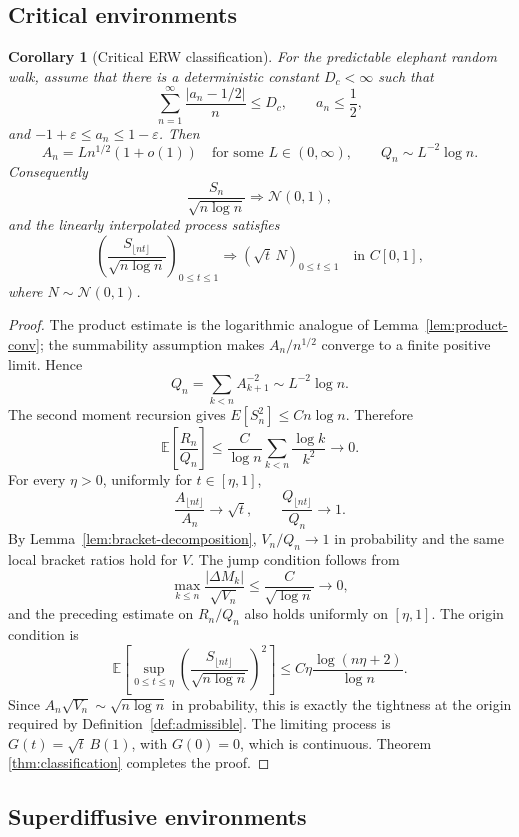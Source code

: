 \documentclass[11pt]{article}
\newtheorem{corollary}{Corollary}
\theoremstyle{definition}
\theoremstyle{remark}
\newcommand{\E}{\mathbb{E}}
\newcommand{\1}{\mathbf{1}}
\newcommand{\N}{\mathcal{N}}
\begin{document}
\subsection{Critical environments}

\begin{corollary}[Critical ERW classification]\label{cor:critical}
For the predictable elephant random walk, assume that there is a deterministic
constant \(D_c<\infty\) such that
\[
  \sum_{n=1}^{\infty}\frac{|a_n-1/2|}{n}\le D_c,
  \qquad a_n\le\frac12,
\]
and \(-1+\varepsilon\le a_n\le1-\varepsilon\). Then
\[
  A_n=L n^{1/2}(1+o(1))
  \quad\text{for some }L\in(0,\infty),
  \qquad
  Q_n\sim L^{-2}\log n.
\]
Consequently
\[
  \frac{S_n}{\sqrt{n\log n}}\Rightarrow \N(0,1),
\]
and the linearly interpolated process satisfies
\[
  \left(\frac{S_{\lfloor nt\rfloor}}{\sqrt{n\log n}}\right)_{0\le t\le1}
  \Rightarrow
  \left(\sqrt t\,N\right)_{0\le t\le1}
  \quad\text{in }C[0,1],
\]
where \(N\sim\N(0,1)\).
\end{corollary}

\begin{proof}
The product estimate is the logarithmic analogue of
Lemma~\ref{lem:product-conv}; the summability assumption makes
\(A_n/n^{1/2}\) converge to a finite positive limit. Hence
\[
  Q_n=\sum_{k<n}A_{k+1}^{-2}\sim L^{-2}\log n.
\]
The second moment recursion gives \(E[S_n^2]\le Cn\log n\). Therefore
\[
  \E\left[\frac{R_n}{Q_n}\right]
  \le
  \frac{C}{\log n}\sum_{k<n}\frac{\log k}{k^2}\to0.
\]
For every \(\eta>0\), uniformly for \(t\in[\eta,1]\),
\[
  \frac{A_{\lfloor nt\rfloor}}{A_n}\to\sqrt t,
  \qquad
  \frac{Q_{\lfloor nt\rfloor}}{Q_n}\to1.
\]
By Lemma~\ref{lem:bracket-decomposition}, \(V_n/Q_n\to1\) in probability and the
same local bracket ratios hold for \(V\).
The jump condition follows from
\[
  \max_{k\le n}\frac{|\Delta M_k|}{\sqrt{V_n}}
  \le \frac{C}{\sqrt{\log n}}\to0,
\]
and the preceding estimate on \(R_n/Q_n\) also holds uniformly on
\([\eta,1]\). The origin condition is
\[
  \E\left[\sup_{0\le t\le\eta}
  \left(\frac{S_{\lfloor nt\rfloor}}{\sqrt{n\log n}}\right)^2\right]
  \le C\eta\frac{\log(n\eta+2)}{\log n}.
\]
Since \(A_n\sqrt{V_n}\sim\sqrt{n\log n}\) in probability, this is exactly the tightness at the
origin required by Definition~\ref{def:admissible}. The limiting process is
\(G(t)=\sqrt t\,B(1)\), with \(G(0)=0\), which is continuous. Theorem
\ref{thm:classification} completes the proof.
\end{proof}

\subsection{Superdiffusive environments}
\end{document}
